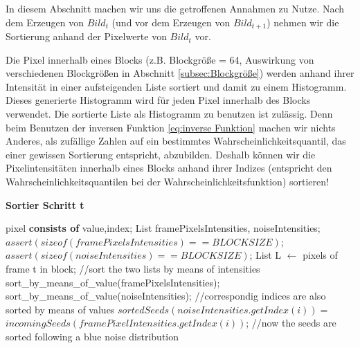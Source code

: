 In diesem Abschnitt machen wir uns die getroffenen  Annahmen 
zu Nutze. Nach dem Erzeugen von $Bild_{t}$ (und vor dem Erzeugen von $Bild_{t+1}$) nehmen wir die Sortierung
anhand der Pixelwerte von $Bild_{t}$ vor. 

\par

Die Pixel innerhalb eines Blocks (z.B. Blockgröße = 64, Auswirkung von verschiedenen Blockgrößen in Abschnitt \ref{subsec:Blockgröße}) werden anhand ihrer 
Intensität in einer aufsteigenden Liste sortiert und damit zu einem Histogramm. Dieses generierte Histogramm wird für jeden Pixel innerhalb des Blocks verwendet.
Die sortierte Liste als Histogramm zu benutzen ist zulässig. Denn beim Benutzen der inversen Funktion \ref{eq:inverse Funktion} machen wir nichts Anderes, als 
zufällige Zahlen auf ein bestimmtes Wahrscheinlichkeitsquantil, das einer gewissen Sortierung entspricht, abzubilden. Deshalb können wir die Pixelintensitäten 
innerhalb eines Blocks anhand ihrer Indizes (entspricht den Wahrscheinlichkeitsquantilen bei der Wahrscheinlichkeitsfunktion) sortieren! 

\begin{tcolorbox}
\begin{algorithm}[H]
    \caption{\textbf{Sortier Schritt t}}
    \begin{algorithmic}[1]
        \State pixel \textbf{consists of} value,index;
        \State List framePixelsIntensities, noiseIntensities;
        \State $assert(sizeof(framePixelsIntensities)==BLOCKSIZE)$;
        \State $assert(sizeof(noiseIntensities)==BLOCKSIZE)$;
        \State List L $\leftarrow$ pixels of frame t in block;
        \State \hfill
        \State //sort the two lists by means of intensities
        \State sort\_by\_means\_of\_value(framePixelsIntensities);
        \State sort\_by\_means\_of\_value(noiseIntensities);
        \State \hfill
        \State //correspondig indices are also sorted by means of values
        \State $sortedSeeds(noiseIntensities.getIndex(i)) = $
        \State $incomingSeeds(framePixelIntensities.getIndex(i))$;
        \EndFor
        \State //now the seeds are sorted following a blue noise distribution
    \end{algorithmic}
    \label{alg:Sortier}
\end{algorithm}
\end{tcolorbox}

